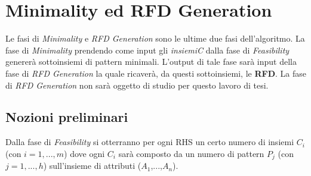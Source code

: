 \section{Minimality ed RFD Generation}
Le fasi di \emph{Minimality} e \emph{RFD Generation} sono le ultime due fasi dell'algoritmo. La fase di \emph{Minimality} prendendo come input gli \emph{insiemiC} dalla fase di \emph{Feasibility} genererà sottoinsiemi di pattern minimali. L'output di tale fase sarà input della fase di \emph{RFD Generation} la quale ricaverà, da questi sottoinsiemi, le \textbf{RFD}. La fase di \emph{RFD Generation} non sarà oggetto di studio per questo lavoro di tesi.
\subsection{Nozioni preliminari}
Dalla fase di \emph{Feasibility} si otterranno per ogni RHS un certo numero di insiemi $C_i$ (con $i=1,...,m$) dove ogni $C_i$ sarà composto da un numero di pattern $P_j$ (con $j=1,...,h$) sull'insieme di attributi ($A_1$,...,$A_n$).
